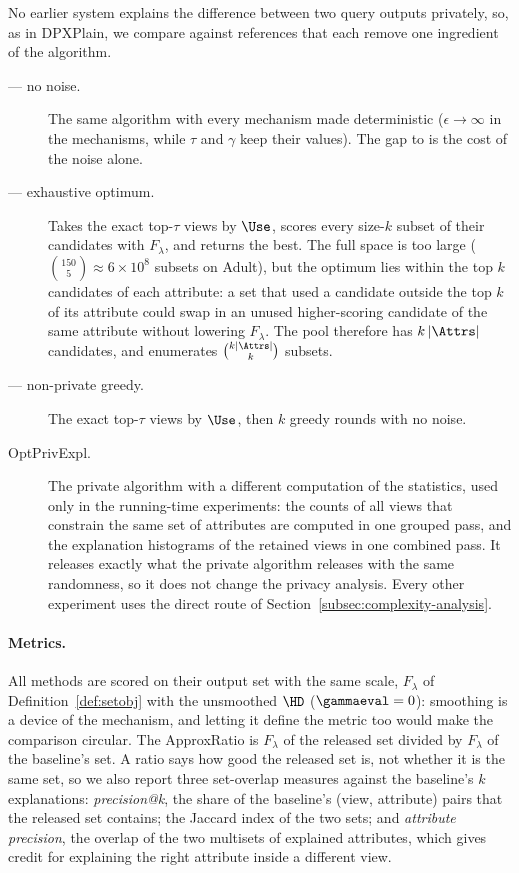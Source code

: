 No earlier system explains the difference between two query outputs privately, so, as in DPXPlain, we compare against references that each remove one ingredient of the algorithm.

\begin{description}
  \item[\Bone{} --- no noise.] The same algorithm with every mechanism made deterministic ($\epsilon\rightarrow\infty$ in the mechanisms, while $\tau$ and $\gamma$ keep their values). The gap to \Bone{} is the cost of the noise alone.
  \item[\Btwo{} --- exhaustive optimum.] Takes the exact top-$\tau$ views by $\Use$, scores every size-$k$ subset of their candidates with $F_\lambda$, and returns the best. The full space is too large ($\binom{150}{5}\approx6\times10^{8}$ subsets on Adult), but the optimum lies within the top $k$ candidates of each attribute: a set that used a candidate outside the top $k$ of its attribute could swap in an unused higher-scoring candidate of the same attribute without lowering $F_\lambda$. The pool therefore has $k\,|\Attrs|$ candidates, and \Btwo{} enumerates $\binom{k|\Attrs|}{k}$ subsets.
  \item[\Bthree{} --- non-private greedy.] The exact top-$\tau$ views by $\Use$, then $k$ greedy rounds with no noise.
  \item[\textsf{OptPrivExpl}.] The private algorithm with a different computation of the statistics, used only in the running-time experiments: the counts of all views that constrain the same set of attributes are computed in one grouped pass, and the explanation histograms of the retained views in one combined pass. It releases exactly what the private algorithm releases with the same randomness, so it does not change the privacy analysis. Every other experiment uses the direct route of Section~\ref{subsec:complexity-analysis}.
\end{description}

\paragraph{Metrics.}
All methods are scored on their output set with the same scale, $F_\lambda$ of Definition~\ref{def:setobj} with the unsmoothed $\HD$ ($\gammaeval=0$): smoothing is a device of the mechanism, and letting it define the metric too would make the comparison circular.
The ApproxRatio is $F_\lambda$ of the released set divided by $F_\lambda$ of the baseline's set.
A ratio says how good the released set is, not whether it is the same set, so we also report three set-overlap measures against the baseline's $k$ explanations: \emph{precision@k}, the share of the baseline's (view, attribute) pairs that the released set contains; the Jaccard index of the two sets; and \emph{attribute precision}, the overlap of the two multisets of explained attributes, which gives credit for explaining the right attribute inside a different view.

